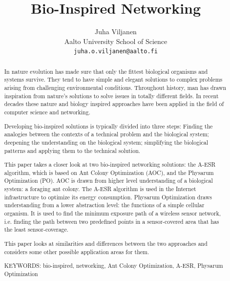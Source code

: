 \documentclass[cameraready]{IWORK2014}
\begin{document}

\title{Bio-Inspired Networking}

\author{Juha Viljanen\\
        Aalto University School of Science \\
	\texttt{juha.o.viljanen@aalto.fi}}
\maketitle


\begin{abstract}
In nature evolution has made sure that only the fittest biological organisms and systems survive. They tend to have simple and elegant solutions to complex problems arising from challenging environmental conditions. Throughout history, man has drawn inspiration from nature's solutions to solve issues in totally different fields. In recent decades these nature and biology inspired approaches have been applied in the field of computer science and networking.

Developing bio-inspired solutions is typically divided into three steps: Finding the analogies between the contexts of a technical problem and the biological system; deepening the understanding on the biological system; simplifying the biological patterns and applying them to the technical solution.

This paper takes a closer look at two bio-inspired networking solutions: the A-ESR algorithm, which is based on Ant Colony Optimization (AOC), and the Physarum Optimization (PO). AOC is drawn from higher level understanding of a biological system: a foraging ant colony. The A-ESR algorithm is used in the Internet infrastructure to optimize its energy consumption. Physarum Optimization draws understanding from a lower abstraction level: the functions of a simple cellular organism. It is used to find the minimum exposure path of a wireless sensor network, i.e. finding the path between two predefined points in a sensor-covered area that has the least sensor-coverage.

This paper looks at similarities and differences between the two approaches and considers some other possible application areas for them.

\vspace{3mm}
\noindent KEYWORDS: bio-inspired, networking, Ant Colony Optimization, A-ESR, Physarum Optimization

\end{abstract}
\end{document}

